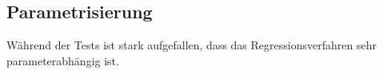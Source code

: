 \subsection{Parametrisierung}
Während der Tests ist stark aufgefallen, dass das Regressionsverfahren sehr parameterabhängig ist.

